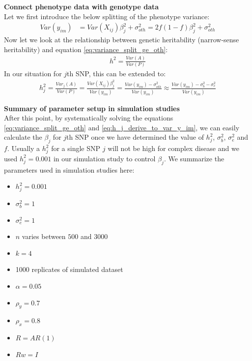 \documentclass[compress]{beamer}
\begin{document}
\begin{frame}[allowframebreaks]
\framebreak
\textbf{Connect phenotype data with genotype data}\\
Let we first introduce the below splitting of the phenotype variance:
\begin{align}
Var(y_{im} ) & = Var(X_{ij}) \beta_j^2 + \sigma_{oth} ^ 2  = 2f(1-f) \beta_j^2 + \sigma_{oth}^2
\label{eq:variance_split_ge_oth}
\end{align}
Now let we look at the relationship between genetic heritability (narrow-sense heritability) and equation \eqref{eq:variance_split_ge_oth}:
\begin{align}
h^2 = \frac{Var(A)}{Var(P)}
\end{align}
In our situation for $j$th SNP, this can be extended to:
\begin{align}
h_j^2 = \frac{Var_j(A)}{Var(P)} = \frac{Var(X_{ij}) \beta_j^2 } {Var(y_{im} )} = \frac{Var(y_{im} ) - \sigma^2_{oth} } {Var(y_{im} )} \approx \frac{Var(y_{im} ) - \sigma_b^2 - \sigma_e^2 } {Var(y_{im} )}
\label{eq:h_j_derive_to_var_y_im}
\end{align}

\framebreak
\textbf{Summary of parameter setup in simulation studies}\\
After this point, by systematically solving the equations \eqref{eq:variance_split_ge_oth} and \eqref{eq:h_j_derive_to_var_y_im}, we can easily calculate the $\beta_j$ for $j$th SNP once we have determined the value of $h_j^2$, $\sigma_b^2$, $\sigma_e^2$ and $f$. Usually a $h_j^2$ for a single SNP $j$ will not be high for complex disease and we used $h_j^2 = 0.001$ in our simulation study to control $\beta_j$.
We summarize the parameters used in simulation studies here:
\begin{itemize}
\item $h_j^2 = 0.001$
\item $\sigma_b^2 = 1$
\item $\sigma_e^2 = 1$
\item $n$ varies between $500$ and $3000$ 
\item $k = 4$
\item 1000 replicates of simulated dataset
\item $\alpha = 0.05$
\item $\rho_y = 0.7$
\item $\rho_x = 0.8$
\item $R = AR(1)$
\item $Rw = I$
\end{itemize}


\end{frame}
\end{document}
